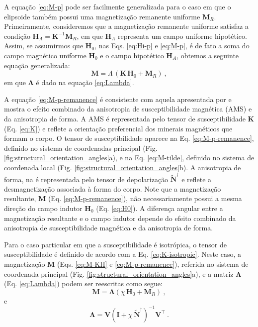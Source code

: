 A equação \ref{eq:M-p} pode ser facilmente generalizada para o caso em que o elipsoide também possui uma magnetização remanente uniforme ${\mathbf{M}}_{R}$. Primeiramente, consideremos que a magnetização remanente uniforme satisfaz a condição ${\mathbf{H}}_{A} = {\mathbf{K}}^{-1} {\mathbf{M}}_{R}$, em que ${\mathbf{H}}_{A}$ representa um campo uniforme hipotético. Assim, se assumirmos que ${\mathbf{H}}_{0}$,
nas Eqs. \ref{eq:Hi-p} e \ref{eq:M-p}, é de fato a soma do campo magnético uniforme ${\mathbf{H}}_{0}$ e o campo hipotético ${\mathbf{H}}_{A}$, obtemos a seguinte equação generalizada:
\begin{equation}
{\mathbf{M}} =  
{\Lambda} \,
\left( {\mathbf{K}} \, {\mathbf{H}}_{0} + {\mathbf{M}}_{R} \right) \: ,
\label{eq:M-p-remanence}
\end{equation}
em que $\mathbf{{\Lambda}}$ é dado na equação \ref{eq:Lambda}.

A equação \ref{eq:M-p-remanence} é consistente com aquela apresentada por \citet[Eq. ~38]{clark1986} e mostra o efeito combinado da anisotropia de susceptibilidade magnética (AMS) e da anisotropia de forma. A AMS é representada pelo tensor de susceptibilidade $\mathbf{K}$ (Eq. \ref{eq:K}) e reflete a orientação preferencial dos minerais magnéticos que formam o corpo. O tensor de susceptibilidade aparece na Eq. \ref{eq:M-p-remanence}, definido no sistema de coordenadas principal (Fig. \ref{fig:structural_orientation_angles}a), e na Eq. \ref{eq:M-tilde}, definido no sistema de coordenada local
(Fig. \ref{fig:structural_orientation_angles}b). A anisotropia de forma, na é representada pelo tensor de depolarização $\tilde{\mathbf{N}}^{\dagger}$ e reflete a desmagnetização associada à forma do corpo. Note que a magnetização resultante, $\mathbf{M}$ (Eq. \ref{eq:M-p-remanence}), não necessariamente possui a mesma direção do campo indutor $\mathbf{H}_{0}$
(Eq. \ref{eq:H0}). A diferença angular entre a magnetização resultante e o campo indutor depende do efeito combinado da anisotropia de susceptibilidade magnética e da anisotropia de forma.

Para o caso particular em que a susceptibilidade é isotrópica,
o tensor de susceptibilidade é definido de acordo com a Eq. \ref{eq:K-isotropic}.
Neste caso, a magnetização $\mathbf{M}$ (Eqs. \ref{eq:M-KH} e \ref{eq:M-p-remanence}),
referida no sistema de coordenada principal (Fig. \ref{fig:structural_orientation_angles}a),
e a matriz $\mathbf{\Lambda}$ (Eq. \ref{eq:Lambda})
podem ser reescritas como segue:
\begin{equation}
\mathbf{M} = \mathbf{\Lambda} \left( \chi \, \mathbf{H}_{0} +
\mathbf{M}_{R} \right) \: ,
\label{eq:M-K-isotropic}
\end{equation}
e
\begin{equation}
\mathbf{\Lambda} = \mathbf{V}
\left( \mathbf{I} + \chi \, \tilde{\mathbf{N}}^{\dagger} \right)^{-1}
\mathbf{V}^{\top} \: .
\label{eq:Lambda-K-isotropic}
\end{equation}

